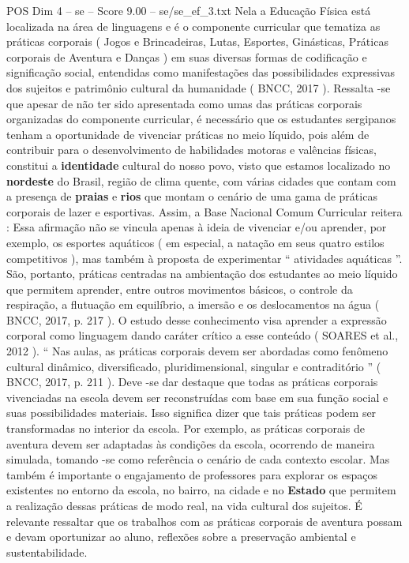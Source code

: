 \begin{textsample}{POS Dim 4 – se – Score 9.00 – se/se\_ef\_3.txt}
Nela a Educação Física está localizada na área de linguagens e é o componente curricular que tematiza as práticas corporais ( Jogos e Brincadeiras, Lutas, Esportes, Ginásticas, Práticas corporais de Aventura e Danças ) em suas diversas formas de codificação e significação social, entendidas como manifestações das possibilidades expressivas dos sujeitos e patrimônio cultural da humanidade ( BNCC, 2017 ).
Ressalta -se que apesar de não ter sido apresentada como umas das práticas corporais organizadas do componente curricular, é necessário que os estudantes sergipanos tenham a oportunidade de vivenciar práticas no meio líquido, pois além de contribuir para o desenvolvimento de habilidades motoras e valências físicas, constitui a \textbf{identidade} cultural do nosso povo, visto que estamos localizado no \textbf{nordeste} do Brasil, região de clima quente, com várias cidades que contam com a presença de \textbf{praias} e \textbf{rios} que montam o cenário de uma gama de práticas corporais de lazer e esportivas.
Assim, a Base Nacional Comum Curricular reitera : Essa afirmação não se vincula apenas à ideia de vivenciar e/ou aprender, por exemplo, os esportes aquáticos ( em especial, a natação em seus quatro estilos competitivos ), mas também à proposta de experimentar “ atividades aquáticas ”.
São, portanto, práticas centradas na ambientação dos estudantes ao meio líquido que permitem aprender, entre outros movimentos básicos, o controle da respiração, a flutuação em equilíbrio, a imersão e os deslocamentos na água ( BNCC, 2017, p. 217 ).
O estudo desse conhecimento visa aprender a expressão corporal como linguagem dando caráter crítico a esse conteúdo ( SOARES et al., 2012 ). “ Nas aulas, as práticas corporais devem ser abordadas como fenômeno cultural dinâmico, diversificado, pluridimensional, singular e contraditório ” ( BNCC, 2017, p. 211 ).
Deve -se dar destaque que todas as práticas corporais vivenciadas na escola devem ser reconstruídas com base em sua função social e suas possibilidades materiais.
Isso significa dizer que tais práticas podem ser transformadas no interior da escola.
Por exemplo, as práticas corporais de aventura devem ser adaptadas às condições da escola, ocorrendo de maneira simulada, tomando -se como referência o cenário de cada contexto escolar.
Mas também é importante o engajamento de professores para explorar os espaços existentes no entorno da escola, no bairro, na cidade e no \textbf{Estado} que permitem a realização dessas práticas de modo real, na vida cultural dos sujeitos.
É relevante ressaltar que os trabalhos com as práticas corporais de aventura possam e devam oportunizar ao aluno, reflexões sobre a preservação ambiental e sustentabilidade.

\end{textsample}
